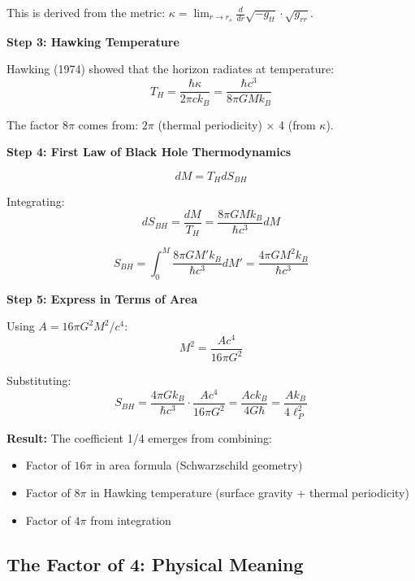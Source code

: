 \documentclass[12pt,a4paper]{article}
\begin{document}
This is derived from the metric: $\kappa = \lim_{r \to r_s} \frac{d}{dr}\sqrt{-g_{tt}}\cdot\sqrt{g_{rr}}$.

\textbf{Step 3: Hawking Temperature}

Hawking (1974) showed that the horizon radiates at temperature:
\begin{equation}
T_H = \frac{\hbar \kappa}{2\pi c k_B} = \frac{\hbar c^3}{8\pi GM k_B}
\end{equation}

The factor $8\pi$ comes from: $2\pi$ (thermal periodicity) $\times$ 4 (from $\kappa$).

\textbf{Step 4: First Law of Black Hole Thermodynamics}

\begin{equation}
dM = T_H dS_{BH}
\end{equation}

Integrating:
\begin{equation}
dS_{BH} = \frac{dM}{T_H} = \frac{8\pi GM k_B}{\hbar c^3} dM
\end{equation}

\begin{equation}
S_{BH} = \int_0^M \frac{8\pi GM' k_B}{\hbar c^3} dM' = \frac{4\pi G M^2 k_B}{\hbar c^3}
\end{equation}

\textbf{Step 5: Express in Terms of Area}

Using $A = 16\pi G^2 M^2/c^4$:
\begin{equation}
M^2 = \frac{Ac^4}{16\pi G^2}
\end{equation}

Substituting:
\begin{equation}
S_{BH} = \frac{4\pi G k_B}{\hbar c^3} \cdot \frac{Ac^4}{16\pi G^2} = \frac{Ac k_B}{4G\hbar} = \frac{A k_B}{4\ell_P^2}
\end{equation}

\textbf{Result:} The coefficient 1/4 emerges from combining:
\begin{itemize}
    \item Factor of $16\pi$ in area formula (Schwarzschild geometry)
    \item Factor of $8\pi$ in Hawking temperature (surface gravity + thermal periodicity)
    \item Factor of $4\pi$ from integration
\end{itemize}

\subsection{The Factor of 4: Physical Meaning}
\end{document}
